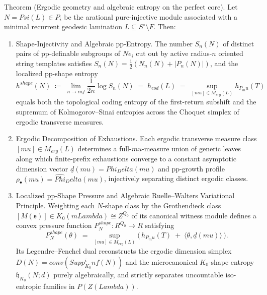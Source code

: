 \documentclass[11pt,a4paper,reqno]{amsart}
\def\mathcal#1{#1}%
\def\mathbb#1{#1}%
\def\mathrm#1{#1}%
\def\operatorname#1{#1}%
\def\forb{F}%
\def\Zg{Z}%
\def\md{m}%
\def\subset{\subseteq}%
\def\infty{inf}%
\def\mu{mu}%
\def\Psi{Psi}%
\def\Phi{Phi}%
\def\Delta{Delta}%
\def\Lambda{Lambda}%
\def\emph#1{#1}%
\def\textbf#1{#1}%
\theoremstyle{definition}
\theoremstyle{remark}
\newcommand{\Z}{\mathbb{Z}}
\newcommand{\R}{\mathbb{R}}
\newcommand{\md}[1]{\operatorname{mod}(#1)}
\newcommand{\Zg}{\operatorname{Zg}}
\newcommand{\forb}{\mathfrak{F}}
\begin{document}
\medskip
{}%
\noindent\textbf{Theorem  (Ergodic geometry and algebraic entropy on the perfect core).}%
\label{thm:theorem_E}
\emph{Let $N = \Psi(\mathcal{L}) \in \mathcal{P}_i$ be the arational pure-injective module associated with a minimal recurrent geodesic lamination $\mathcal{L} \subset \mathcal{S}^\circ \setminus \forb$. Then:
\begin{enumerate}[label=(\arabic*), leftmargin=*]
\item \textbf{Shape-Injectivity and Algebraic pp-Entropy.} The number $S_n(N)$ of distinct pairs of pp-definable subgroups of $N e_i$ cut out by active radius-$n$ oriented string templates satisfies $S_n(N) = \frac{1}{2}(N_n(N) + |P_n(N)|)$, and the \emph{localized pp-shape entropy}
\[
h^{\mathrm{shape}}(N) \;\coloneqq\; \lim_{n \to \infty} \frac{1}{2n}\log S_n(N) \;=\; h_{\mathrm{cod}}(\mathcal{L}) \;=\; \sup_{[\mu] \in \mathcal{M}_{\mathrm{erg}}(\mathcal{L})} h_{\mathbb{P}_\mu}(T)
\]
equals both the topological coding entropy of the first-return subshift and the supremum of Kolmogorov--Sinai entropies across the Choquet simplex of ergodic transverse measures.
\item \textbf{Ergodic Decomposition of Exhaustions.} Each ergodic transverse measure class $[\mu] \in \mathcal{M}_{\mathrm{erg}}(\mathcal{L})$ determines a full-$\mu$-measure union of generic leaves along which finite-prefix exhaustions converge to a constant asymptotic dimension vector $\underline{d}(\mu) = \Phi_\Delta(\mu)$ and pp-growth profile $\rho_\bullet(\mu) = \widehat{\Phi}_\Delta(\mu)$, injectively separating distinct ergodic classes.
\item \textbf{Localized pp-Shape Pressure and Algebraic Ruelle--Walters Variational Principle.} Weighting each $N$-shape class by the Grothendieck class $[M(\mathfrak{s})] \in K_0(\md{\Lambda}) \cong \Z^{Q_0}$ of its canonical witness module defines a convex pressure function $P^{\mathrm{shape}}_N \colon \R^{Q_0} \to \R$ satisfying
\[
P^{\mathrm{shape}}_N(\theta) \;=\; \sup_{[\mu] \in \mathcal{M}_{\mathrm{erg}}(\mathcal{L})} \bigl(\, h_{\mathbb{P}_\mu}(T) \;+\; \langle \theta, \underline{d}(\mu) \rangle \,\bigr).
\]
Its Legendre--Fenchel dual reconstructs the ergodic dimension simplex $\mathcal{D}(N) = \operatorname{conv}(\operatorname{Supp}_{K_0}^\infty(N))$ and the microcanonical $K_0$-shape entropy $\mathfrak{h}_{K_0}(N; d)$ purely algebraically, and strictly separates uncountable iso-entropic families in $\mathcal{P}(\Zg(\Lambda))$.

\end{enumerate}}
\end{document}
